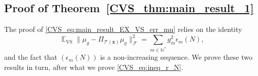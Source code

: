 \documentclass[twoside,11pt]{book}
\numberwithin{theorem}{chapter}
\numberwithin{definition}{chapter}
\numberwithin{proposition}{chapter}
\numberwithin{corollary}{chapter}
\numberwithin{example}{chapter}
\numberwithin{lemma}{chapter}
\numberwithin{assumption}{chapter}
\numberwithin{equation}{chapter}
\numberwithin{figure}{chapter}
\DeclareMathOperator{\VS}{\mathrm{VS}}
\DeclareMathOperator{\Tran}{\intercal}
\DeclareMathOperator{\EX}{\mathbb{E}}
\DeclareMathOperator{\F}{\mathcal{F}}
\DeclareMathOperator{\Ns}{\mathbb{N}^{*}}
\begin{document}

\subsection{Proof of Theorem~\ref{CVS_thm:main_result_1}}\label{CVS_app:proof_main_result_1}
The proof of \eqref{CVS_eq:main_result_EX_VS_err_mu} relies on the identity
\begin{equation}\label{CVS_eq:main_result_EX_VS_err_mu_2}
\EX_{\VS} \|\mu_{g} - \Pi_{\mathcal{T}(\bm{x})} \mu_{g}\|_{\F}^{2} = \sum\limits_{m \in \mathbb{N}^{*}} g_{m}^{2} \epsilon_{m}(N),
\end{equation}
and the fact that $(\epsilon_{m}(N))$ is a non-increasing sequence. We prove these two results in turn, after what we prove \eqref{CVS_eq:ineq_r_N}.
\end{document}
